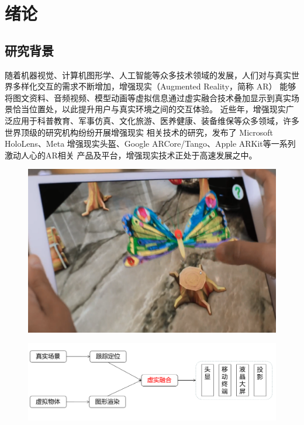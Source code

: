 \chapter{绪论}\label{chap:introduction}

\section{研究背景}\label{sec:ResearchBackground}

随着机器视觉、计算机图形学、人工智能等众多技术领域的发展，人们对与真实世界多样化交互的需求不断增加，增强现实（Augmented Reality，简称 AR）
能够将图文资料、音频视频、模型动画等虚拟信息通过虚实融合技术叠加显示到真实场景恰当位置处，以此提升用户与真实环境之间的交互体验。
近些年，增强现实广泛应用于科普教育、军事仿真、文化旅游、医养健康、装备维保等众多领域，许多世界顶级的研究机构纷纷开展增强现实
相关技术的研究，发布了 Microsoft HoloLens、Meta 增强现实头盔、Google ARCore/Tango、Apple ARKit等一系列激动人心的AR相关
产品及平台，增强现实技术正处于高速发展之中。
\begin{figure}[!htbp]
    \centering
    \includegraphics[width=\textwidth]{Img/1-ARExample.png}
    \label{fig:ARExample}
\end{figure}

\begin{figure}[!htbp]
    \centering
    \includegraphics[width=\textwidth]{Img/1-ARflow.png}
    \label{fig:ARflow}
\end{figure}


